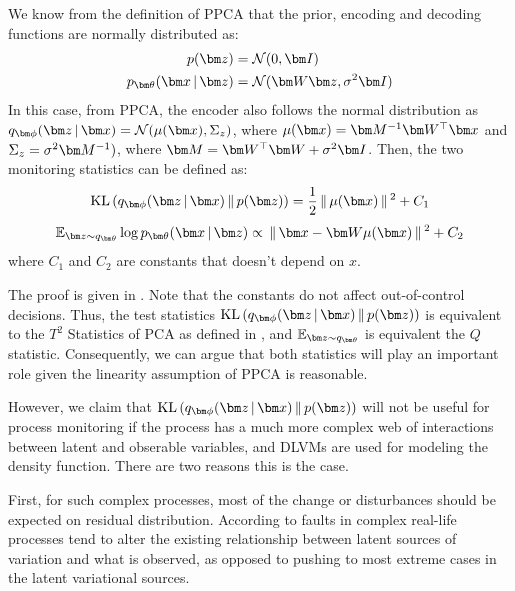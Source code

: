 \documentclass[journal, peerreview]{IEEEtran}
\begin{document}
\begin{prop}
\label{prop: T2Q} 
We know from the definition of PPCA \cite{tipping1999probabilistic} that the prior, encoding and decoding functions are normally distributed as:
\begin{equation*}
\begin{split}
p(\mbz)& = \Norm(0,\mbI)\\
\decoding &= \Norm(\mbW\mbz,\sigma^2 \mbI)  
\label{eq: Gaussian}
\end{split}
\end{equation*}
In this case, from PPCA, the encoder also follows the normal distribution as $\encoding =\Norm(\mu(\mbx),\Sigma_z)$, where $\mu(\mbx) = \mbM^{-1} \mbW^\top \mbx$ and  $\Sigma_z = \sigma^2\mbM^{-1})$, where $\mbM = \mbW^\top \mbW + \sigma^2 \mbI$.
Then, the two monitoring statistics can be defined as: 
\begin{equation}
    \label{eqn:KL_PPCA}
	\KL{\encoding}{p(\mbz)} = \frac{1}{2} \gg \mu(\mbx) \gg^2 + C_1
\end{equation}
\begin{equation}
    \label{eqn:E_PPCA}
	\E_{\mbz \sim q_{\mbtheta}} \log \decoding \propto \gg\mbx-\mbW \mu(\mbx) \gg^{2} + C_2
\end{equation}
where $C_1$ and $C_2$ are constants that doesn't depend on $x$.
\end{prop}
The proof is given in . 
Note that the constants do not affect out-of-control decisions. 
Thus, the test statistics $\KL{\encoding}{p(\mbz)}$ is equivalent to the $T^{2}$ Statistics of PCA as defined in , and $\E_{\mbz \sim q_{\mbtheta}}$ is equivalent the $Q$ statistic.
Consequently, we can argue that both statistics will play an important role given the linearity assumption of PPCA is reasonable.

However, we claim that $\KL{\encoding}{p(\mbz)}$ will not be useful for process monitoring if the process has a much more complex web of interactions between latent and obserable variables, and DLVMs are used for modeling the density function.
There are two reasons this is the case.

First, for such complex processes, most of the change or disturbances should be expected on residual distribution. 
According to \cite{severson2016perspectives} faults in complex real-life processes tend to alter the existing relationship between latent sources of variation and what is observed, as opposed to pushing to most extreme cases in the latent variational sources.
\end{document}

